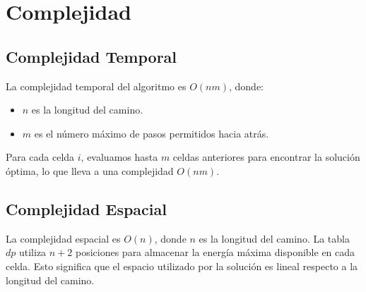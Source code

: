 \documentclass{article}
\begin{document}
\section*{Complejidad}

\subsection*{Complejidad Temporal}
La complejidad temporal del algoritmo es \( O(nm) \), donde:
\begin{itemize}
    \item \( n \) es la longitud del camino.
    \item \( m \) es el número máximo de pasos permitidos hacia atrás.
\end{itemize}
Para cada celda \( i \), evaluamos hasta \( m \) celdas anteriores para encontrar la solución óptima, lo que lleva a una complejidad \( O(nm) \).

\subsection*{Complejidad Espacial}
La complejidad espacial es \( O(n) \), donde \( n \) es la longitud del camino. La tabla \( dp \) utiliza \( n + 2 \) posiciones para almacenar la energía máxima disponible en cada celda. Esto significa que el espacio utilizado por la solución es lineal respecto a la longitud del camino.
\end{document}
